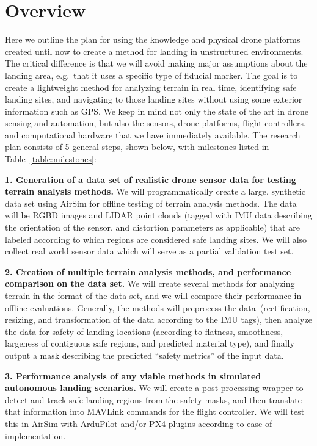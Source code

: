 \section{Overview}
\label{section:research_plan_overview}

Here we outline the plan for using the knowledge and physical drone platforms created
until now to create a method for landing in unstructured environments.
The critical difference is that we will avoid making major assumptions about the landing area,
e.g.~that it uses a specific type of fiducial marker.
The goal is to create a lightweight method for analyzing terrain in real time,
identifying safe landing sites,
and navigating to those landing sites without using some exterior information such as GPS.
We keep in mind not only the state of the art in drone sensing and automation,
but also the sensors, drone platforms, flight controllers,
and computational hardware that we have immediately available.
The research plan consists of 5 general steps, shown below, with milestones listed in Table~\ref{table:milestones}:

\textbf{1. Generation of a data set of realistic drone sensor data for testing terrain analysis methods.}
We will programmatically create a large, synthetic data set using AirSim for offline testing of terrain analysis methods.
The data will be RGBD images and LIDAR point clouds (tagged with IMU data describing the orientation of the sensor, and distortion parameters as applicable)
that are labeled according to which regions are considered safe landing sites.
We will also collect real world sensor data which will serve as a partial validation test set.

\textbf{2. Creation of multiple terrain analysis methods, and performance comparison on the data set.}
We will create several methods for analyzing terrain in the format of the data set,
and we will compare their performance in offline evaluations.
Generally, the methods will preprocess the data~(rectification, resizing, and transformation of the data according to the IMU tags),
then analyze the data for safety of landing locations (according to flatness, smoothness, largeness of contiguous safe regions, and predicted material type),
and finally output a mask describing the predicted ``safety metrics'' of the input data.

\textbf{3. Performance analysis of any viable methods in simulated autonomous landing scenarios.}
We will create a post-processing wrapper to detect and track safe landing regions from the safety masks,
and then translate that information into MAVLink commands for the flight controller.
We will test this in AirSim with ArduPilot and/or PX4 plugins according to ease of implementation.

